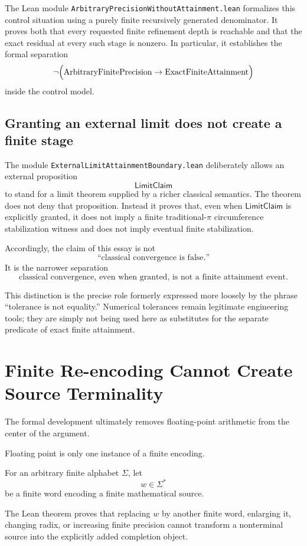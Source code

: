 \documentclass[11pt,a4paper]{article}
\begin{document}
The Lean module
\texttt{ArbitraryPrecisionWithoutAttainment.lean} formalizes this
control situation using a purely finite recursively generated
denominator.  It proves both that every requested finite refinement
depth is reachable and that the exact residual at every such stage is
nonzero.  In particular, it establishes the formal separation
\[
\neg\Bigl(
  \operatorname{ArbitraryFinitePrecision}
  \rightarrow
  \operatorname{ExactFiniteAttainment}
\Bigr)
\]
inside the control model.

\subsection{Granting an external limit does not create a finite stage}

The module
\texttt{ExternalLimitAttainmentBoundary.lean} deliberately allows an
external proposition
\[
\mathsf{LimitClaim}
\]
to stand for a limit theorem supplied by a richer classical semantics.
The theorem does not deny that proposition.  Instead it proves that,
even when $\mathsf{LimitClaim}$ is explicitly granted, it does not imply
a finite traditional-$\pi$ circumference stabilization witness and does
not imply eventual finite stabilization.

Accordingly, the claim of this essay is not
\[
\text{``classical convergence is false.''}
\]
It is the narrower separation
\[
\boxed{
\text{classical convergence, even when granted, is not a finite
attainment event.}
}
\]

This distinction is the precise role formerly expressed more loosely
by the phrase ``tolerance is not equality.''  Numerical tolerances
remain legitimate engineering tools; they are simply not being used
here as substitutes for the separate predicate of exact finite
attainment.


\section{Finite Re-encoding Cannot Create Source Terminality}

The formal development ultimately removes floating-point arithmetic
from the center of the argument.

Floating point is only one instance of a finite encoding.

For an arbitrary finite alphabet \(\Sigma\), let
\[
w\in\Sigma^\ast
\]
be a finite word encoding a finite mathematical source.

The Lean theorem proves that replacing \(w\) by another finite word,
enlarging it, changing radix, or increasing finite precision cannot
transform a nonterminal source into the explicitly added completion
object.
\end{document}
